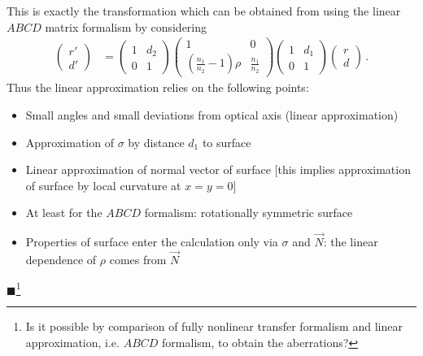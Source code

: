 \documentclass[12pt,a4paper,twoside,openright,BCOR10mm,headsepline,titlepage,abstracton,chapterprefix,final]{scrreprt}
\newcommand{\remark}[1]{{\color{red}$\blacksquare$}\footnote{{\color{red}#1}}}
\begin{document}
This is exactly the transformation which can be obtained from using the linear $ABCD$ matrix formalism by considering
\begin{align}
 \begin{pmatrix} r'  \\ d' \end{pmatrix} &=
 \begin{pmatrix} 1 & d_2 \\ 0 & 1 \end{pmatrix}
 \begin{pmatrix} 1 & 0 \\ \left(\frac{n_1}{n_2} - 1\right)\rho & \frac{n_1}{n_2} \end{pmatrix}
 \begin{pmatrix} 1 & d_1 \\ 0 & 1 \end{pmatrix}
 \begin{pmatrix} r  \\ d \end{pmatrix}\,.
\end{align}
Thus the linear approximation relies on the following points:
\begin{itemize}
 \item Small angles and small deviations from optical axis (linear approximation)
 \item Approximation of $\sigma$ by distance $d_1$ to surface 
 \item Linear approximation of normal vector of surface [this implies approximation of surface by local curvature at $x=y=0$]
 \item At least for the $ABCD$ formalism: rotationally symmetric surface
 \item Properties of surface enter the calculation only via $\sigma$ and $\vec{N}$: the linear dependence of $\rho$ comes from $\vec{N}$
\end{itemize}
\remark{Is it possible by comparison of fully nonlinear transfer formalism and linear approximation, i.e. $ABCD$ formalism, to obtain the
aberrations?}
\end{document}
